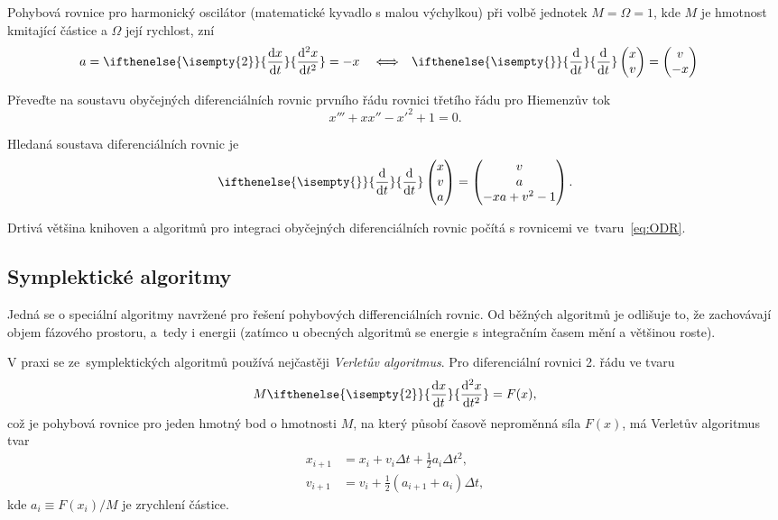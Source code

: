 \documentclass[a4paper,11pt,twoside]{article}
\renewcommand{\d}{\mathrm{d}}
\newcommand{\derivative}[3][]{\ifthenelse{\isempty{#1}}	    %
	{\frac{\d{#2}}{\d{#3}}}
	{\frac{\d^{#1}{#2}}{\d{#3}^{#1}}}
}
\def\makematrix#1{\begin{pmatrix}#1\end{pmatrix}}       %
\theoremstyle{red}
\theoremstyle{green}
\begin{document}
    \begin{example}
    Pohybová rovnice pro harmonický oscilátor (matematické kyvadlo s malou výchylkou) při volbě jednotek $M=\Omega=1$, kde $M$ je hmotnost kmitající částice a $\Omega$ její rychlost, zní
    \begin{align}
        a&=\derivative[2]{x}{t}=-x &&\Longleftrightarrow &
        \derivative{}{t}\makematrix{x \\ v}&=\makematrix{v \\ -x}
    \end{align}

    \end{example}

    \begin{voluntary}
    Převeďte na soustavu obyčejných diferenciálních rovnic prvního řádu rovnici třetího řádu pro Hiemenzův tok
    \begin{equation}
        x'''+xx''-x'^{2}+1=0.
    \end{equation}
    \end{voluntary}

    \begin{solution}
    Hledaná soustava diferenciálních rovnic je
    \begin{equation}
        \derivative{}{t}\makematrix{x \\ v \\ a}=\makematrix{v \\ a \\ -xa+v^{2}-1}.
    \end{equation}
    \end{solution}

    Drtivá většina knihoven a algoritmů pro integraci obyčejných diferenciálních rovnic počítá s rovnicemi ve~tvaru~\eqref{eq:ODR}.

\subsection{Symplektické algoritmy}
    Jedná se o speciální algoritmy navržené pro řešení pohybových differenciálních rovnic.
    Od běžných algoritmů je odlišuje to, že zachovávají objem fázového prostoru, a~tedy i energii (zatímco u obecných algoritmů se energie s integračním časem mění a většinou roste).
    
    V praxi se ze~symplektických algoritmů používá nejčastěji \emph{Verletův algoritmus}.
    Pro diferenciální rovnici 2. řádu ve tvaru 
    \begin{equation}\label{eq:EM}
        M\derivative[2]{x}{t}=F(x),
    \end{equation}
    což je pohybová rovnice pro jeden hmotný bod o hmotnosti $M$, na který působí časově neproměnná síla $F(x)$, má Verletův algoritmus tvar
    \begin{align}
        x_{i+1}&=x_{i}+v_{i}\Delta t+\frac{1}{2}a_{i}\Delta t^{2},\nonumber\\
        v_{i+1}&=v_{i}+\frac{1}{2}\left(a_{i+1}+a_{i}\right)\Delta t,
        \label{eq:Verlet}
    \end{align}
    kde $a_{i}\equiv F(x_{i})/M$ je zrychlení částice.
\end{document}
